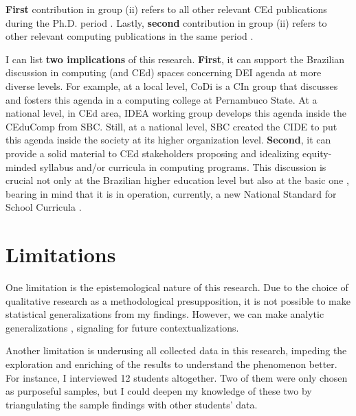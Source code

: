 \textbf{First} contribution in group (ii) refers to all other relevant \gls{CEd} publications during the \gls{Ph.D.} period \cite{bispojr:2024-nmp,bispojr:2024-urca,feitosa:2024,cavalcanti:2024,pereira:2024,melo:2024-horizontes,boaventura:2024-sbgames,
boaventura:2023,esmeraldo:2023,freire:2023-rsc,freire:2023-encompif, santos:2022,bispojr:2022-educomp,esmeraldo:2022,bispojr:2021,bispojr:2021-educomp,bispojr:2021-wei,bispojr:2020-tec}. Lastly, \textbf{second} contribution in group (ii) refers to other relevant computing publications in the same period \cite{cavalcanti:2024-ieee,bispojr:2023-edi,bispojr:2023-rbie,sansil:2023,lima:2022,bispojr:2022-snee}.

I can list \textbf{two implications} of this research. \textbf{First}, it can support the Brazilian discussion in computing (and \gls{CEd}) spaces concerning \gls{DEI} agenda at more diverse levels. For example, at a local level, \gls{CoDi} is a \gls{CIn} group that discusses and fosters this agenda in a computing college at Pernambuco State. At a national level, in \gls{CEd} area, \gls{IDEA} working group \cite{pereira:2024,melo:2024-horizontes} develops this agenda inside the \gls{CEduComp} from \gls{SBC}. Still, at a national level, \gls{SBC} created the \gls{CIDE} to put this agenda inside the society at its higher organization level. \textbf{Second}, it can provide a solid material to \gls{CEd} stakeholders proposing and idealizing equity-minded syllabus \cite{anderson:2023,gama:2024} and/or curricula \cite{karimi:2024} in computing programs. This discussion is crucial not only at the Brazilian higher education level \cite{moro:2022} but also at the basic one \cite{falcao:2021}, bearing in mind that it is 
in operation, currently, a new National Standard for School Curricula \cite{ribeiro:2023}.

 \section{Limitations}
 \label{conclusions-sec:limitations}

One limitation is the epistemological nature of this research. Due to the choice of qualitative research as a methodological presupposition, it is not possible to make statistical generalizations from my findings. However, we can make analytic generalizations \cite{kennedy:1979}, signaling for future contextualizations.

Another limitation is underusing all collected data in this research, impeding the exploration and enriching of the results to understand the phenomenon better. For instance, I interviewed 12 students altogether. Two of them were only chosen as purposeful samples, but I could deepen my knowledge of these two by triangulating the sample findings with other students' data.

